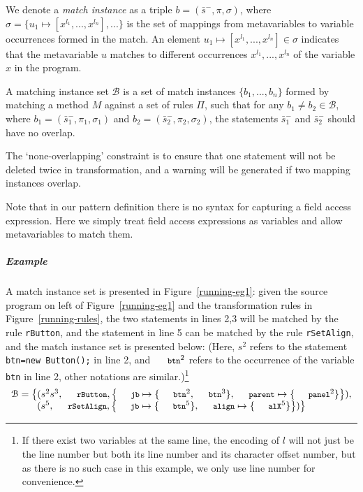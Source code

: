 \documentclass[a4paper, USenglish]{lipics-v2016}
\newcommand{\code}[1]{\texttt{\footnotesize #1}}
\theoremstyle{plain}
\begin{document}
We denote a \emph{match instance} as a triple $b=(\bar{s}^-,\pi,\sigma)$, where $\sigma=\{u_1\mapsto[x^{l_1},...,x^{l_n}],...\}$ is the set of mappings from metavariables to variable occurrences formed in the match. An element $u_1\mapsto[x^{l_1},...,x^{l_n}]\in\sigma$ indicates that the metavariable $u$ matches to different occurrences $x^{l_1},...,x^{l_n}$ of the variable $x$ in the program.

\begin{definition}
A matching instance set $\mathcal{B}$ is a set of match instances
$\{b_1,...,b_n\}$ formed by matching a method $M$ against a set of rules $\Pi$,
such that for any $b_1\neq b_2\in
\mathcal{B}$, where $b_1=(\bar{s}_1^-,\pi_1,\sigma_1)$ and
$b_2=(\bar{s}_2^-,\pi_2,\sigma_2)$, the statements $\bar{s}_1^-$ and
$\bar{s}_2^-$ should have no overlap.
\end{definition}
The `none-overlapping' constraint is to ensure
that one statement will not be deleted twice in transformation, 
and a warning will be generated if two mapping instances overlap.

Note that in our pattern definition there is no syntax for capturing
a field access expression. Here we simply treat field access expressions as variables
and allow metavariables to match them.

\subparagraph*{Example} A match instance set is presented in Figure~\ref{running-eg1}: given the source program on left of Figure~\ref{running-eg1} and the transformation rules in Figure~\ref{running-rules}, the two statements in lines 2,3 will be matched by the rule \code{rButton}, and the statement in line 5 can be matched by the rule \code{rSetAlign}, and the match instance set is presented below: (Here, $s^2$ refers to the statement \code{btn=new Button();} in line 2, and $\code{btn}^2$ refers to the occurrence of the variable \code{btn} in line 2, other notations are similar.)\footnote{If there exist two variables at the same line, the encoding of $l$ will not just be the line number but both its line number and its character offset number, but as there is no such case in this example, we only use line number for convenience.}
\begin{equation}
\label{eqn:basic-matchinstance}
\begin{array}{l}
 	\mathcal{B}=\big\{(s^2s^3, \code{rButton}, \left\{\code{jb}\mapsto\{\code{btn}^2, \code{btn}^3\}, \code{parent}\mapsto\{\code{panel}^2\}\right\}),\\
 	\quad\quad~~(s^5, \code{rSetAlign}, \left\{\code{jb}\mapsto\{\code{btn}^5\}, \code{align}\mapsto\{\code{alX}^5\}\right\})\big\}
\end{array}
\end{equation}
\end{document}
